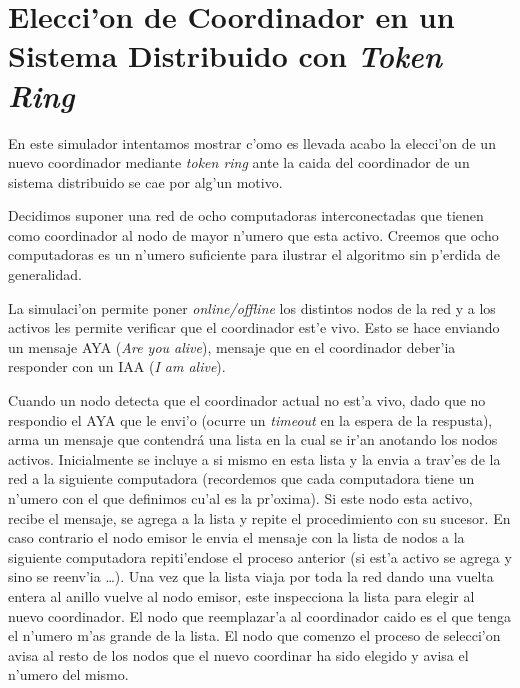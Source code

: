 \section{Elecci'on de Coordinador en un Sistema Distribuido con \emph{Token Ring}}
En este simulador intentamos mostrar c'omo es llevada acabo la elecci'on de un
nuevo coordinador mediante \emph{token ring} ante la caida del coordinador de
un sistema distribuido se cae por alg'un motivo.

Decidimos suponer una red de ocho computadoras interconectadas que tienen como
coordinador al nodo de mayor n'umero que esta activo. Creemos que ocho
computadoras es un n'umero suficiente para ilustrar el algoritmo sin p'erdida
de generalidad.

La simulaci'on permite poner \emph{online/offline} los distintos nodos de la
red y a los activos les permite verificar que el coordinador est'e vivo. Esto
se hace enviando un mensaje AYA (\emph{Are you alive}), mensaje que en el
coordinador deber'ia responder con un IAA (\emph{I am alive}).

Cuando un nodo detecta que el coordinador actual no est'a vivo, dado que no
respondio el AYA que le envi'o (ocurre un  \emph{timeout} en la espera de la
respusta), arma un mensaje que contendrá una lista en la cual se ir'an anotando
los nodos activos. Inicialmente se incluye a si mismo en
esta lista y la envia a trav'es de la red a la siguiente computadora
(recordemos que cada computadora tiene un n'umero con el que definimos cu'al es
la pr'oxima). Si este nodo esta activo, recibe el mensaje, se agrega a la lista
y repite el procedimiento con su sucesor. En caso contrario el nodo emisor le 
envia el mensaje con la lista de nodos a la siguiente computadora repiti'endose
el proceso anterior (si est'a activo se agrega y sino se reenv'ia \ldots). Una vez
que la lista viaja por toda la red dando una vuelta entera al anillo vuelve al
nodo emisor, este inspecciona la lista para elegir al nuevo coordinador. El
nodo que reemplazar'a al coordinador caido es el que tenga el n'umero m'as
grande de la lista. El nodo que comenzo el proceso de selecci'on avisa al resto
de los nodos que el nuevo coordinar ha sido elegido y avisa el n'umero del
mismo.


